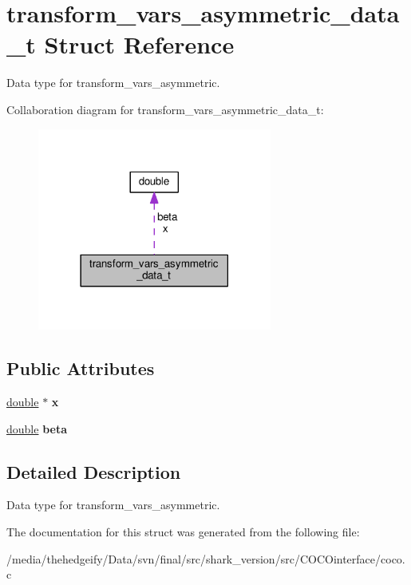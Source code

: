 \hypertarget{structtransform__vars__asymmetric__data__t}{}\section{transform\+\_\+vars\+\_\+asymmetric\+\_\+data\+\_\+t Struct Reference}
\label{structtransform__vars__asymmetric__data__t}


Data type for transform\+\_\+vars\+\_\+asymmetric.  




Collaboration diagram for transform\+\_\+vars\+\_\+asymmetric\+\_\+data\+\_\+t\+:\nopagebreak
\begin{figure}[H]
\begin{center}
\leavevmode
\includegraphics[width=218pt]{structtransform__vars__asymmetric__data__t__coll__graph}
\end{center}
\end{figure}
\subsection*{Public Attributes}
\begin{DoxyCompactItemize}
\item 
\hyperlink{classdouble}{double} $\ast$ {\bfseries x}\hypertarget{structtransform__vars__asymmetric__data__t_adb1ea690caf00b60953daf7271c88d7b}{}\label{structtransform__vars__asymmetric__data__t_adb1ea690caf00b60953daf7271c88d7b}

\item 
\hyperlink{classdouble}{double} {\bfseries beta}\hypertarget{structtransform__vars__asymmetric__data__t_a9e6f52da0112d5b564cf0d7199130ec8}{}\label{structtransform__vars__asymmetric__data__t_a9e6f52da0112d5b564cf0d7199130ec8}

\end{DoxyCompactItemize}


\subsection{Detailed Description}
Data type for transform\+\_\+vars\+\_\+asymmetric. 

The documentation for this struct was generated from the following file\+:\begin{DoxyCompactItemize}
\item 
/media/thehedgeify/\+Data/svn/final/src/shark\+\_\+version/src/\+C\+O\+C\+Ointerface/coco.\+c\end{DoxyCompactItemize}
